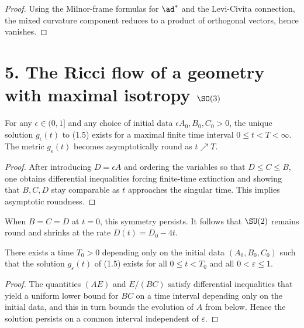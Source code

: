 \begin{proof}
\sketch Using the Milnor-frame formulas for $\ad^*$ and the Levi-Civita connection, the mixed curvature component reduces to a product of orthogonal vectors, hence vanishes.
\end{proof}

\section*{5. The Ricci flow of a geometry with maximal isotropy $\SO(3)$}

\begin{proposition}
\label{ch01-prop-su2-collapse}
For any $\epsilon \in (0,1]$ and any choice of initial data $\epsilon A_0, B_0, C_0 > 0$, the unique solution $g_\epsilon(t)$ to (1.5) exists for a maximal finite time interval $0 \leq t < T < \infty$. The metric $g_\epsilon(t)$ becomes asymptotically round as $t \nearrow T$.
\end{proposition}

\begin{proof}
\sketch After introducing $D=\epsilon A$ and ordering the variables so that $D\le C \le B$, one obtains differential inequalities forcing finite-time extinction and showing that $B,C,D$ stay comparable as $t$ approaches the singular time. This implies asymptotic roundness.
\end{proof}

\begin{remark}
\label{ch01-rem-round-sphere}
When $B=C=D$ at $t=0$, this symmetry persists. It follows that $\SU(2)$ remains round and shrinks at the rate $D(t)=D_0-4t$.
\end{remark}

\begin{lemma}
\label{ch01-lem-common-time-interval}
There exists a time $T_0>0$ depending only on the initial data $(A_0,B_0,C_0)$ such that the solution $g_\varepsilon(t)$ of (1.5) exists for all $0\le t<T_0$ and all $0<\varepsilon\le 1$.
\end{lemma}

\begin{proof}
\sketch The quantities $(AE)$ and $E/(BC)$ satisfy differential inequalities that yield a uniform lower bound for $BC$ on a time interval depending only on the initial data, and this in turn bounds the evolution of $A$ from below. Hence the solution persists on a common interval independent of $\varepsilon$.
\end{proof}

